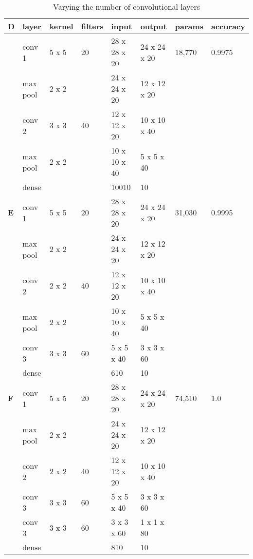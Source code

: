\documentclass[conference,compsoc]{IEEEtran}
\begin{document}
\begin{table*}
\centering

\begin{tabular}[t]{l l l l l l |l l}
\toprule
 \textbf{D} & layer &   kernel & filters & input & output & params &accuracy\\
\midrule
  & conv 1 &   5 x 5 &      20 &       28 x 28 x 20 & 24 x 24 x 20 &18,770& 0.9975\\
  & max pool &   2 x 2 &       &       24 x 24 x 20 & 12 x 12 x 20 \\
    & conv 2 &   3 x 3 &    40   &       12 x 12 x 20 & 10 x 10 x 40 \\
      & max pool &   2 x 2 &       &       10 x 10 x 40 & 5 x 5 x 40 \\
  &  dense &    &       &       10010 & 10 \\

\midrule                                                  
  \textbf{E}     & conv 1 &   5 x 5 &      20 &       28 x 28 x 20 & 24 x 24 x 20 &31,030& 0.9995\\
  & max pool &   2 x 2 &       &       24 x 24 x 20 & 12 x 12 x 20 \\
    & conv 2 &   2 x 2 &    40   &       12 x 12 x 20 & 10 x 10 x 40 \\
      & max pool &   2 x 2 &       &       10 x 10 x 40 & 5 x 5 x 40 \\
       & conv 3 &   3 x 3 &    60   &       5 x 5 x 40 & 3 x 3 x 60 \\
  &  dense &    &       &       610 & 10 \\

\midrule                                                  
    \textbf{F}  & conv 1 &   5 x 5 &      20 &       28 x 28 x 20 & 24 x 24 x 20 &74,510&  1.0\\
  & max pool &   2 x 2 &       &       24 x 24 x 20 & 12 x 12 x 20 \\
    & conv 2 &   2 x 2 &    40   &       12 x 12 x 20 & 10 x 10 x 40 \\
       & conv 3 &   3 x 3 &    60   &       5 x 5 x 40 & 3 x 3 x 60 \\
       & conv 3 &   3 x 3 &    60   &       3 x 3 x 60 & 1 x 1 x 80 \\
  &  dense &    &       &       810 & 10 \\
\bottomrule
\end{tabular}



\caption{Varying the number of convolutional layers}
\label{cnnt3}
\end{table*}
\end{document}
